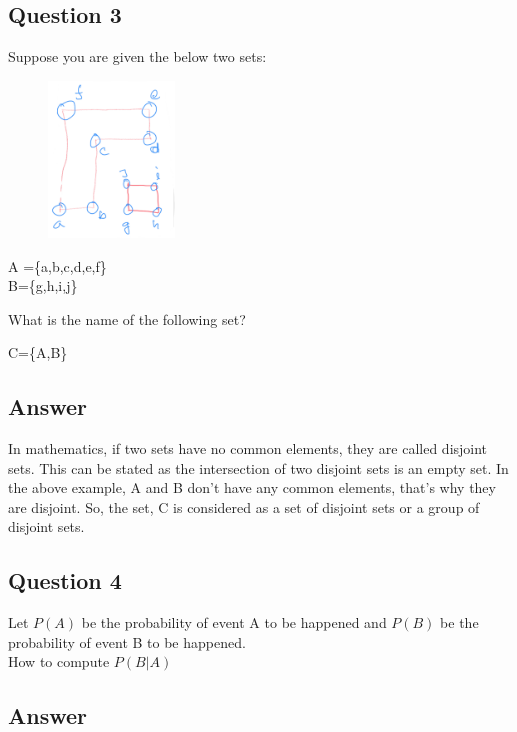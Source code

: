 \documentclass[12]{article}
\begin{document}
\subsection*{Question 3}
Suppose you are given the below two sets:

\begin{figure}
\centering
\includegraphics[width=0.3\textwidth]{images/set.png}
\end{figure}

\begin{center}
    A =\{a,b,c,d,e,f\}\\
    B=\{g,h,i,j\}
\end{center}

What is the name of the following set?
\begin{center}
C=\{A,B\}
\end{center}


\subsection*{Answer}

In mathematics, if two sets have no common elements, they are called disjoint sets. This can be stated as the intersection of two disjoint sets is an empty set. In the above example, A and B don't have any common elements, that's why they are disjoint. So, the set, C is considered as a set of disjoint sets or a group of disjoint sets.


\subsection*{Question 4}
Let $P(A)$ be the probability of event A to be happened and $P(B)$ be the probability of event B to be happened. \\ How to compute $P(B|A)$

\subsection*{Answer}
\end{document}
